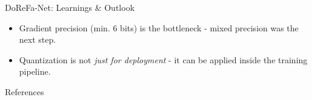 \documentclass[aspectratio=169]{beamer} %
\begin{document}
\begin{frame}{DoReFa-Net: Learnings \& Outlook}
  \begin{itemize}
    \item Gradient precision (min. 6 bits) is the bottleneck - mixed precision was the
          next step.
    \item Quantization is not \textit{just for deployment} - it can be applied inside the
          training pipeline.
  \end{itemize}
\end{frame}

\begin{skipframecount}
  \begin{frame}[allowframebreaks]{References}
    \printbibliography[heading=none]
  \end{frame}

  \appendix
\end{skipframecount}
\end{document}
